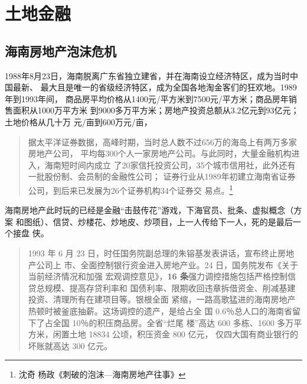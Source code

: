 \section{土地金融}
\label{sec:92tudi}




\subsection{海南房地产泡沫危机}
\label{subsec:hainan}


1988年8月23日，海南脱离广东省独立建省，并在海南设立经济特区，成为当时中国最新、
最大且是唯一的省级经济特区，成为全国各地淘金客们的狂欢地。1989年到1993年间，
商品房平均价格从1400元/平方米到7500元/平方米；商品房年销售面积从1000万平方米
到9000多万平方米；房地产投资总额从3.2亿元到93亿元；土地价格从几十万
元/亩到600万元/亩，


\begin{quotation}
  据太平洋证券数据，高峰时期，当时总人数不过656万的海岛上有两万多家房地产公司，
  平均每300个人一家房地产公司。与此同时，大量金融机构进入，海南短时间内成立
  了20家信托投资公司，35个城市信用社，此外还有一批股份制、会员制的金融性公司；
  证券行业从1989年初建立海南省证券公司，到后来已发展为26个证券机构34个证券交
  易点。\footnote{沈奇 杨政《刺破的泡沫—海南房地产往事》}
\end{quotation}

海南房地产此时玩的已经是金融“击鼓传花”游戏，下海官员、批条、虚拟概念（方案
和图纸）、信贷、炒楼花、炒地皮、炒项目，上一人传给下一人，死的是最后一个接盘
侠。

\begin{quotation}
  1993 年 6 月 23 日，时任国务院副总理的朱镕基发表讲话，宣布终止房地产公司上
  市、全面控制银行资金进入房地产业。24 日，国务院发布《关于当前经济情况和加强
  宏观调控意见》，\textbf{16 条}强力调控措施包括严格控制信贷总规模、提高存贷利率和
  国债利率、限期收回违章拆借资金、削减基建投资、清理所有在建项目等。银根全面
  紧缩，一路高歌猛进的海南房地产热顿时被釜底抽薪。这场调控的遗产，是给占全
  国 0.6％总人口的海南省留下了占全国 10％的积压商品房。全省“烂尾
  楼”高达 600 多栋、1600 多万平方米，闲置土地 18834 公顷，积压资金 800 亿元，
  仅四大国有商业银行的坏账就高达 300 亿元。
\end{quotation}

